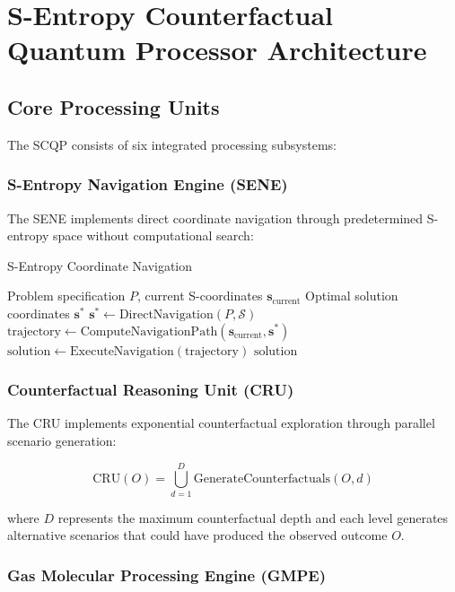 \documentclass[12pt,a4paper]{article}
\begin{document}
\section{S-Entropy Counterfactual Quantum Processor Architecture}

\subsection{Core Processing Units}

The SCQP consists of six integrated processing subsystems:

\subsubsection{S-Entropy Navigation Engine (SENE)}

The SENE implements direct coordinate navigation through predetermined S-entropy space without computational search:

\begin{algorithm}
\caption{S-Entropy Coordinate Navigation}
\begin{algorithmic}[1]
\Require Problem specification $P$, current S-coordinates $\mathbf{s}_{\text{current}}$
\Ensure Optimal solution coordinates $\mathbf{s}^*$
\State $\mathbf{s}^* \leftarrow \text{DirectNavigation}(P, \mathcal{S})$
\State $\text{trajectory} \leftarrow \text{ComputeNavigationPath}(\mathbf{s}_{\text{current}}, \mathbf{s}^*)$
\State $\text{solution} \leftarrow \text{ExecuteNavigation}(\text{trajectory})$
\Return $\text{solution}$
\end{algorithmic}
\end{algorithm}

\subsubsection{Counterfactual Reasoning Unit (CRU)}

The CRU implements exponential counterfactual exploration through parallel scenario generation:

\begin{equation}
\text{CRU}(O) = \bigcup_{d=1}^{D} \text{GenerateCounterfactuals}(O, d)
\end{equation}

where $D$ represents the maximum counterfactual depth and each level generates alternative scenarios that could have produced the observed outcome $O$.

\subsubsection{Gas Molecular Processing Engine (GMPE)}
\end{document}
